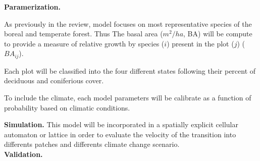 


\textbf{Paramerization.} 

As previously in the review, model focuses on most representative species of the boreal and temperate forest. Thus 
The basal area ($m^2/ha$, BA) will be compute to provide a measure of relative
growth by species ($i$) present in the plot ($j$) ($BA_{ij}$).

Each plot will be classified into the four different states following their percent of deciduous and coniferious cover.  

To include the climate, each model parameters will be calibrate as a
function of probability based on climatic conditions. %

\textbf{Simulation.} This model will be incorporated in a spatially explicit cellular automaton or lattice in
order to evaluate the velocity of the transition into differents patches and differents
climate change scenario.\\


\textbf{Validation.} 






\clearpage
\newpage






